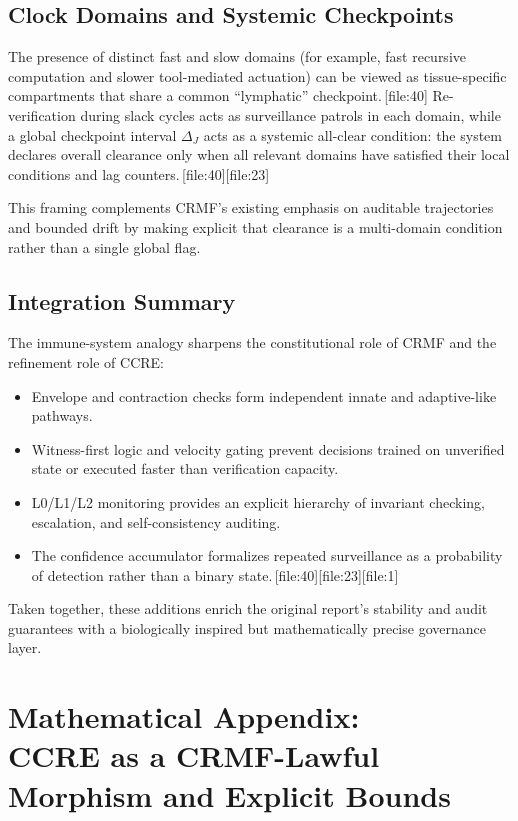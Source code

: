 \documentclass[11pt]{article}
\begin{document}
\subsection*{Clock Domains and Systemic Checkpoints}

The presence of distinct fast and slow domains (for example, fast recursive computation and slower tool-mediated actuation) can be viewed as tissue-specific compartments that share a common “lymphatic” checkpoint.\,[file:40]
Re-verification during slack cycles acts as surveillance patrols in each domain, while a global checkpoint interval \( \Delta_J \) acts as a systemic all-clear condition: the system declares overall clearance only when all relevant domains have satisfied their local conditions and lag counters.\,[file:40][file:23]

This framing complements CRMF’s existing emphasis on auditable trajectories and bounded drift by making explicit that clearance is a multi-domain condition rather than a single global flag.

\subsection*{Integration Summary}

The immune-system analogy sharpens the constitutional role of CRMF and the refinement role of CCRE:
\begin{itemize}
  \item Envelope and contraction checks form independent innate and adaptive-like pathways.
  \item Witness-first logic and velocity gating prevent decisions trained on unverified state or executed faster than verification capacity.
  \item L0/L1/L2 monitoring provides an explicit hierarchy of invariant checking, escalation, and self-consistency auditing.
  \item The confidence accumulator formalizes repeated surveillance as a probability of detection rather than a binary state.\,[file:40][file:23][file:1]
\end{itemize}
Taken together, these additions enrich the original report’s stability and audit guarantees with a biologically inspired but mathematically precise governance layer.

\appendix
\section*{Mathematical Appendix:\\
CCRE as a CRMF-Lawful Morphism and Explicit Bounds}
\end{document}
